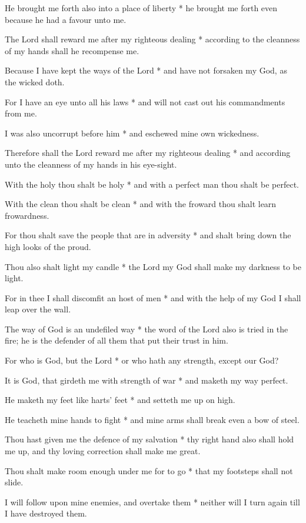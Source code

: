 He brought me forth also into a place of liberty * he brought me forth even because he had a favour unto me.

The Lord shall reward me after my righteous dealing * according to the cleanness of my hands shall he recompense me.

Because I have kept the ways of the Lord * and have not forsaken my God, as the wicked doth.

For I have an eye unto all his laws * and will not cast out his commandments from me.

I was also uncorrupt before him * and eschewed mine own wickedness.

Therefore shall the Lord reward me after my righteous dealing * and according unto the cleanness of my hands in his eye-sight.

With the holy thou shalt be holy * and with a perfect man thou shalt be perfect.

With the clean thou shalt be clean * and with the froward thou shalt learn frowardness.

For thou shalt save the people that are in adversity * and shalt bring down the high looks of the proud.

Thou also shalt light my candle * the Lord my God shall make my darkness to be light.

For in thee I shall discomfit an host of men * and with the help of my God I shall leap over the wall.

The way of God is an undefiled way * the word of the Lord also is tried in the fire; he is the defender of all them that put their trust in him.

For who is God, but the Lord * or who hath any strength, except our God?

It is God, that girdeth me with strength of war * and maketh my way perfect.

He maketh my feet like harts' feet * and setteth me up on high.

He teacheth mine hands to fight * and mine arms shall break even a bow of steel.

Thou hast given me the defence of my salvation * thy right hand also shall hold me up, and thy loving correction shall make me great.

Thou shalt make room enough under me for to go * that my footsteps shall not slide.

I will follow upon mine enemies, and overtake them * neither will I turn again till I have destroyed them.

